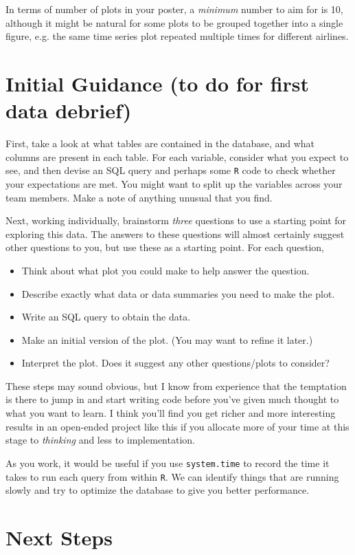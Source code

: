 \documentclass[11pt, oneside]{article}   	%
\begin{document}
In terms of number of plots in your poster, a {\em minimum} number to aim for is 10, although it might be natural for some plots to be grouped together into a single figure, e.g. the same time series plot repeated multiple times for different airlines.

\section{Initial Guidance (to do for first data debrief)}

First, take a look at what tables are contained in the database, and what columns are present in each table. For each variable, consider what you expect to see, and then devise an SQL query and perhaps some {\tt R} code to check whether your expectations are met. You might want to split up the variables across your team members. Make a note of anything unusual that you find.

Next, working individually, brainstorm {\em three} questions to use a starting point for exploring this data. The answers to these questions will almost certainly suggest other questions to you, but use these as a starting point. For each question,
\begin{itemize}
\item Think about what plot you could make to help answer the question.
\item Describe exactly what data or data summaries you need to make the plot.
\item Write an SQL query to obtain the data.
\item Make an initial version of the plot. (You may want to refine it later.)
\item Interpret the plot. Does it suggest any other questions/plots to consider?
\end{itemize}
These steps may sound obvious, but I know from experience that the temptation is there to jump in and start writing code before you've given much thought to what you want to learn. I think you'll find you get richer and more interesting results in an open-ended project like this if you allocate more of your time at this stage to {\em thinking} and less to implementation.

As you work, it would be useful if you use {\tt system.time} to record the time it takes to run each query from within {\tt R}. We can identify things that are running slowly and try to optimize the database to give you better performance.

\section{Next Steps}
\end{document}
